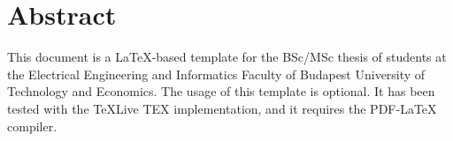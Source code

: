 \chapter*{Abstract}

This document is a \LaTeX -based template for the BSc/MSc thesis of students at the Electrical Engineering and Informatics Faculty of Budapest University of Technology and Economics. The usage of this template is optional. It has been tested with the TeXLive TEX implementation, and it requires the PDF-LaTeX compiler.